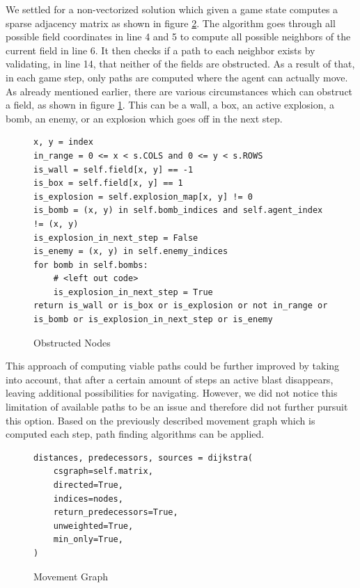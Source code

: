 \documentclass{article}
\begin{document}
We settled for a non-vectorized solution which given a game state computes a sparse adjacency matrix as shown in figure \ref{code:movement_graph}. The algorithm goes through all possible field coordinates in line 4 and 5 to compute all possible neighbors of the current field in line 6. It then checks if a path to each neighbor exists by validating, in line 14, that neither of the fields are obstructed. As a result of that, in each game step, only paths are computed where the agent can actually move. As already mentioned earlier, there are various circumstances which can obstruct a field, as shown in figure \ref{code:obstructed}. This can be a wall, a box, an active explosion, a bomb, an enemy, or an explosion which goes off in the next step.

\begin{figure}[h]
\centering
\begin{verbatim}
x, y = index
in_range = 0 <= x < s.COLS and 0 <= y < s.ROWS
is_wall = self.field[x, y] == -1
is_box = self.field[x, y] == 1
is_explosion = self.explosion_map[x, y] != 0
is_bomb = (x, y) in self.bomb_indices and self.agent_index != (x, y)
is_explosion_in_next_step = False
is_enemy = (x, y) in self.enemy_indices
for bomb in self.bombs:
    # <left out code>
    is_explosion_in_next_step = True
return is_wall or is_box or is_explosion or not in_range or is_bomb or is_explosion_in_next_step or is_enemy
\end{verbatim}
\caption{Obstructed Nodes}
\label{code:obstructed}
\end{figure}

This approach of computing viable paths could be further improved by taking into account, that after a certain amount of steps an active blast disappears, leaving additional possibilities for navigating. However, we did not notice this limitation of available paths to be an issue and therefore did not further pursuit this option. Based on the previously described movement graph which is computed each step, path finding algorithms can be applied.

\begin{figure}[h]
\centering
\begin{verbatim}
distances, predecessors, sources = dijkstra(
    csgraph=self.matrix,
    directed=True,
    indices=nodes,
    return_predecessors=True,
    unweighted=True,
    min_only=True,
)
\end{verbatim}
\caption{Movement Graph}
\label{code:movement_graph}
\end{figure}
\end{document}
